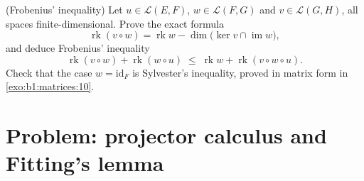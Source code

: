\begin{exercise}[$\star\star\star$]\label{exo:b1:linmaps:12}
(Frobenius' inequality) Let $u \in \mathcal{L}(E, F)$, $w \in
\mathcal{L}(F, G)$ and $v \in \mathcal{L}(G, H)$, all spaces
finite-dimensional. Prove the exact formula
\[
\operatorname{rk}(v \circ w) = \operatorname{rk} w -
\dim\bigl(\ker v \cap \operatorname{im} w\bigr),
\]
and deduce Frobenius' inequality
\[
\operatorname{rk}(v \circ w) + \operatorname{rk}(w \circ u)
\;\leq\; \operatorname{rk} w + \operatorname{rk}(v \circ w \circ
u) .
\]
Check that the case $w = \mathrm{id}_F$ is Sylvester's
inequality, proved in matrix form in \cref{exo:b1:matrices:10}.
\end{exercise}

\section{Problem: projector calculus and Fitting's lemma}

